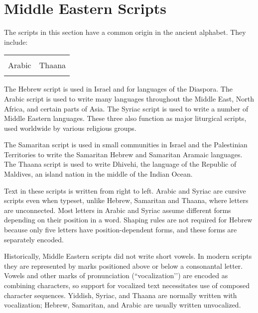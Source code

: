 \chapter{Middle Eastern Scripts}
\label{ch:middleeasternscripts}

The scripts in this section have a common origin in the ancient  alphabet. They include:

\begin{center}
\begin{tabular}{ll}
\nameref{hebrew} & \nameref{s:samaritan}\\
Arabic & Thaana\\
\nameref{s:syriac} &\\
\end{tabular}
\end{center}

The Hebrew script is used in Israel and for languages of the Diaspora. The Arabic script is
used to write many languages throughout the Middle East, North Africa, and certain parts
of Asia. The Syriac script is used to write a number of Middle Eastern languages. These
three also function as major liturgical scripts, used worldwide by various religious groups.

The Samaritan script is used in small communities in Israel and the Palestinian Territories
to write the Samaritan Hebrew and Samaritan Aramaic languages. The Thaana script is
used to write Dhivehi, the language of the Republic of Maldives, an island nation in the
middle of the Indian Ocean. 

Text in these scripts is written from right to left. Arabic and Syriac are cursive scripts even when typeset, unlike Hebrew, Samaritan  and Thaana, where letters are unconnected. Most letters in Arabic and Syriac assume different forms depending on their position in a word. Shaping rules are not required for Hebrew because only five letters have position-dependent forms, and these forms are separately encoded.

Historically, Middle Eastern  scripts did not write short vowels. In modern scripts they are represented  by marks positioned above or below a consonantal letter. Vowels and other
marks of pronunciation (``vocalization’’) are encoded as combining characters, so support
for vocalized text necessitates use of composed character sequences. Yiddish, Syriac, and
Thaana are normally written with vocalization; Hebrew, Samaritan, and Arabic are usually written unvocalized. 













\endinput










